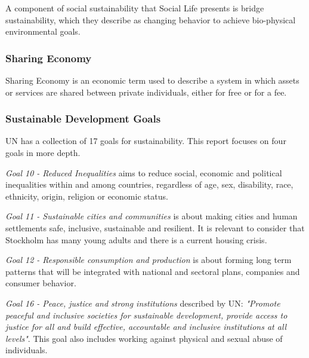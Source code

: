 A component of social sustainability that Social Life presents is bridge sustainability, which they describe as changing behavior to achieve bio-physical environmental goals. \cite{Vallance2011}

\subsubsection{Sharing Economy}
\label{sec:background:sharing-economy}
Sharing Economy is an economic term used to describe a system in which assets or services are shared between private individuals, either for free or for a fee. \cite{Albinsson2018TheEconomy}



\subsubsection{Sustainable Development Goals}
\label{sec:background:sdg}
UN has a collection of 17 goals for sustainability. This report focuses on four goals in more depth.

\textit{Goal 10 - Reduced Inequalities} aims to reduce social, economic and political inequalities within and among countries, regardless of age, sex, disability, race, ethnicity, origin, religion or economic status. 
\cite{UnitedNationsb}

\textit{Goal 11 - Sustainable cities and communities} is about making cities and human settlements safe, inclusive, sustainable and resilient. It is relevant to consider that Stockholm has many young adults and there is a current housing crisis. \cite{Sheiban2002Den1800-talet} \cite{UnitedNationsb}

\textit{Goal 12 - Responsible consumption and production} is about forming long term patterns that will be integrated with national and sectoral plans, companies and consumer behavior. \cite{UnitedNationsGoalPlatform}

\textit{Goal 16 - Peace, justice and strong institutions} described by UN: \textit{"Promote peaceful and inclusive societies for sustainable development, provide access to justice for all and build effective, accountable and inclusive institutions at all levels"}. This goal also includes working against physical and sexual abuse of individuals. \cite{UnitedNationGoalPlatform} 
 

